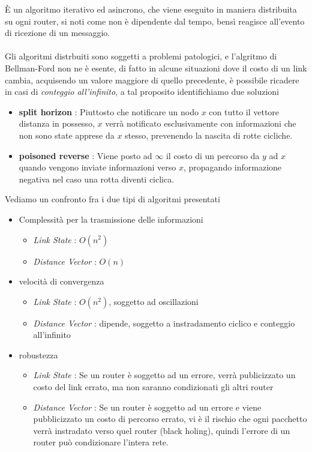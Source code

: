 \documentclass[12pt, letterpaper]{article}
\newcommand{\acc}{\\\hphantom{}\\}
\begin{document}
È un algoritmo iterativo ed asincrono, che viene eseguito in maniera distribuita su ogni router, si noti come non è dipendente 
dal tempo, bensì reagisce all'evento di ricezione di un messaggio.\acc 
Gli algoritmi distrbuiti sono soggetti a problemi patologici, e l'algritmo di Bellman-Ford non ne è esente, di fatto in alcune 
situazioni dove il costo di un link cambia, acquisendo un valore maggiore di quello precedente, è possibile ricadere in casi 
di \textit{conteggio all'infinito}, a tal proposito identifichiamo due soluzioni\begin{itemize}
    \item \textbf{split horizon} : Piuttosto che notificare un nodo $x$ con tutto il vettore distanza in possesso, $x$ verrà 
    notificato esclusivamente con informazioni che non sono state apprese da $x$ stesso, prevenendo la nascita di 
    rotte cicliche. 
    \item \textbf{poisoned reverse} : Viene posto ad $\infty$ il costo di un percorso da $y$ ad $x$ quando vengono inviate 
    informazioni verso $x$, propagando informazione negativa nel caso una rotta diventi ciclica.
\end{itemize}
Vediamo un confronto fra i due tipi di algoritmi presentati\begin{itemize}
    \item Complessità per la trasmissione delle informazioni\begin{itemize}
        \item \textit{Link State} : $O(n^2)$
        \item \textit{Distance Vector} : $O(n)$ 
    \end{itemize}
    \item velocità di convergenza\begin{itemize}
        \item \textit{Link State} : $O(n^2)$, soggetto ad oscillazioni
        \item \textit{Distance Vector} : dipende, soggetto a instradamento ciclico e conteggio all'infinito
    \end{itemize}
    \item robustezza \begin{itemize}
        \item \textit{Link State} : Se un router è soggetto ad un errore, verrà publicizzato un costo del link errato, 
        ma non saranno condizionati gli altri router
        \item \textit{Distance Vector} : Se un router è soggetto ad un errore e viene pubblicizzato un costo di percorso 
        errato, vi è il rischio che ogni pacchetto verrà instradato verso quel router (black holing), quindi l'errore di un 
        router può condizionare l'intera rete.
    \end{itemize}
\end{itemize}
\end{document}
